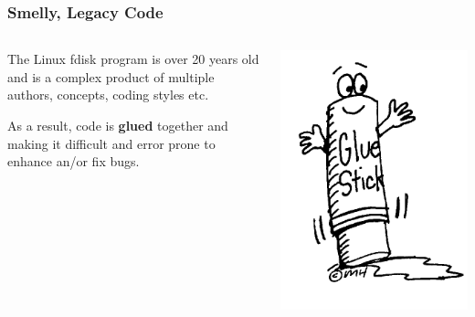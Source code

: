 \documentclass{beamer}
\begin{document}
\begin{frame}\frametitle{Smelly, Legacy Code}
  \begin{columns}
    \begin{column}{.5\linewidth}
      The Linux fdisk program is over 20 years old and is a complex product of multiple authors, concepts, coding styles etc.\newline
      
      As a result, code is \textbf{glued} together and making it difficult and error prone to enhance an/or fix bugs.
    \end{column}
    \begin{column}{.5\linewidth}
      \includegraphics[scale=0.2]{img/glustick} 
    \end{column}
  \end{columns}
\end{frame}
\end{document}
